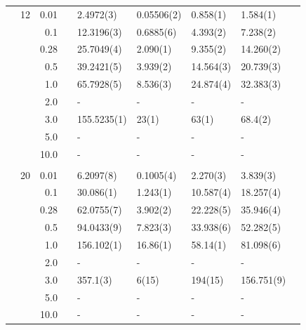 \begin{table}[h]
\begin{tabularx}{\textwidth}{R{1cm}rrcR{2.3cm}R{2.3cm}R{2.3cm}R{2.3cm}R{1cm}}
		&12 & 0.01 && 2.4972(3) & 0.05506(2) & 0.858(1) & 1.584(1)\\
		&& 0.1 && 12.3196(3) & 0.6885(6) & 4.393(2) & 7.238(2) \\
		&& 0.28 && 25.7049(4) & 2.090(1) & 9.355(2) & 14.260(2) \\
		&& 0.5 && 39.2421(5) & 3.939(2) & 14.564(3) & 20.739(3) \\
		&& 1.0 && 65.7928(5) & 8.536(3) & 24.874(4) & 32.383(3) \\
		&& 2.0 && - & - & - & -\\
		&& 3.0 && 155.5235(1) & 23(1) & 63(1) & 68.4(2) \\ 
		&& 5.0 && - & - & - & -\\
		&& 10.0 && - & - & - & -\\
		\hdashline \\
		
		&20 & 0.01 && 6.2097(8) & 0.1005(4) & 2.270(3) & 3.839(3) \\
		&& 0.1 && 30.086(1) & 1.243(1) & 10.587(4) & 18.257(4) \\
		&& 0.28 && 62.0755(7) & 3.902(2) & 22.228(5) & 35.946(4) \\
		&& 0.5 && 94.0433(9) & 7.823(3) & 33.938(6) & 52.282(5) \\
		&& 1.0 && 156.102(1) & 16.86(1) & 58.14(1) & 81.098(6) \\
		&& 2.0 && - & - & - & -\\
		&& 3.0 && 357.1(3) & 6(15) & 194(15) & 156.751(9) \\ 
		&& 5.0 && - & - & - & -\\
		&& 10.0 && - & - & - & -\\
		\hline \hline
	\end{tabularx}
\end{table} 

